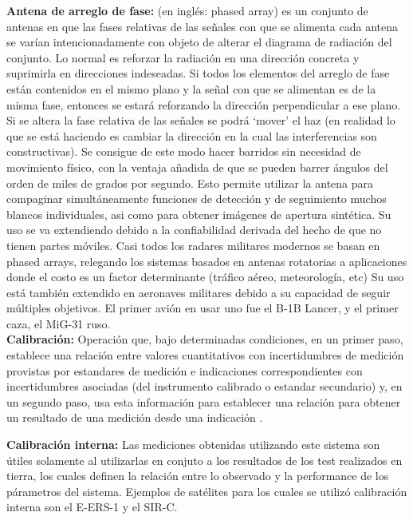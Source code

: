 {\textbf{Antena de arreglo de fase:}}  (en inglés: phased array) es un conjunto de antenas en que las fases relativas de las 
señales con que se alimenta cada antena se varían intencionadamente con objeto de alterar el diagrama de radiación del 
conjunto. Lo normal es reforzar la radiación en una dirección concreta y suprimirla en direcciones indeseadas. Si todos los 
elementos del arreglo de fase están contenidos en el mismo plano y la señal con que se alimentan es de la misma fase, 
entonces se estará reforzando la dirección perpendicular a ese plano. Si se altera la fase relativa de las señales se podrá
\enquote*{mover} el haz (en realidad lo que se está haciendo es cambiar la dirección en la cual las interferencias son 
constructivas). Se consigue de este modo hacer barridos sin necesidad de movimiento físico, con la ventaja añadida de que 
se pueden barrer ángulos del orden de miles de grados por segundo. Esto permite utilizar la antena para compaginar 
simultáneamente funciones de detección y de seguimiento muchos blancos individuales, asi como para obtener imágenes de 
apertura sintética. Su uso se va extendiendo debido a la confiabilidad derivada del hecho de que no tienen partes móviles. 
Casi todos los radares militares modernos se basan en phased arrays, relegando los sistemas basados en antenas rotatorias a 
aplicaciones donde el costo es un factor determinante (tráfico aéreo, meteorología, etc) Su uso está también extendido en
aeronaves militares debido a su capacidad de seguir múltiples objetivos. El primer avión en usar uno fue el B-1B Lancer, y 
el primer caza, el MiG-31 ruso.\\

{\textbf{Calibración:}} Operación que, bajo determinadas condiciones, en un primer paso, establece una relación entre 
valores cuantitativos con incertidumbres de medición provistas por estandares de medición e indicaciones correspondientes
con incertidumbres asociadas (del instrumento calibrado o estandar secundario) y, en un segundo paso, usa
esta información para establecer una relación para obtener un resultado de una medición desde una indicación \cite{CalDef}.

{\textbf{Calibración interna:}} Las mediciones obtenidas utilizando este sistema son útiles solamente al utilizarlas en 
conjuto a los resultados de los test realizados en tierra, los cuales definen la relación entre lo observado y la 
performance de los párametros del sistema. Ejemplos de satélites para los cuales se utilizó calibración interna son el 
E-ERS-1 y el SIR-C.

